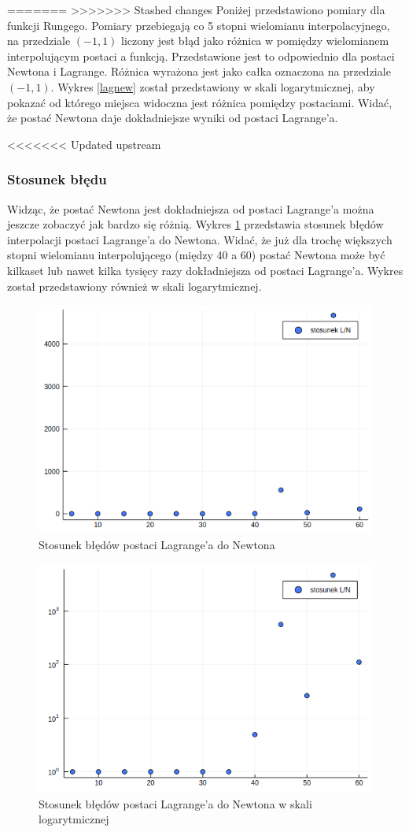 \documentclass[paper=a4, fontsize=11pt]{scrartcl} %
\numberwithin{equation}{section} %
\numberwithin{figure}{section} %
\numberwithin{table}{section} %
\begin{document}
=======
>>>>>>> Stashed changes
Poniżej przedstawiono pomiary dla funkcji Rungego. Pomiary przebiegają
co 5 stopni wielomianu interpolacyjnego, na przedziale $(-1,1)$ liczony jest błąd
jako różnica w pomiędzy wielomianem interpolującym postaci a funkcją.
Przedstawione jest to odpowiednio dla postaci Newtona i Lagrange. 
Różnica wyrażona jest jako całka oznaczona na przedziale $(-1,1)$.
Wykres \ref{lagnew} został przedstawiony w skali logarytmicznej, aby pokazać od którego miejsca
widoczna jest różnica pomiędzy postaciami.
Widać, że postać Newtona daje dokładniejsze wyniki od postaci Lagrange'a.

<<<<<<< Updated upstream
\subsubsection{Stosunek błędu}
Widząc, że postać Newtona jest dokładniejsza od postaci Lagrange'a można jeszcze zobaczyć jak bardzo się różnią.
Wykres \ref{stos} przedstawia stosunek błędów interpolacji postaci Lagrange'a do Newtona. Widać, że
już dla trochę większych stopni wielomianu interpolującego (między 40 a 60) postać Newtona może być kilkaset lub nawet
kilka tysięcy razy dokładniejsza od postaci Lagrange'a. Wykres został przedstawiony również w skali logarytmicznej.
\begin{figure}[h!]
  \includegraphics[width=120mm]{stosunek.png}
  \caption{Stosunek błędów postaci Lagrange'a do Newtona}
  \label{stos}
\end{figure} 
\begin{figure}[h!]
  \includegraphics[width=120mm]{stosunek_log.png}
  \caption{Stosunek błędów postaci Lagrange'a do Newtona w skali logarytmicznej}
  \label{stos_log}
\end{figure} 
\end{document}
